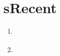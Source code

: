 \NEWMOD

\section{sRecent}



\begin{frame}[fragile,label=s-recent] 
\modframetitle{\sRecent}
\small
\begin{center}
\begin{minipage}{3.25in}
\begin{enumerate}
\item \hyperlink{ss-recent-particles<1>}   {\BUTTON {\ssRecentParticles}}
\item \hyperlink{ss-recent-gravity<1>}     {\BUTTON {\ssRecentGravity}}
\end{enumerate}
\end{minipage}
\end{center}
\end{frame}



